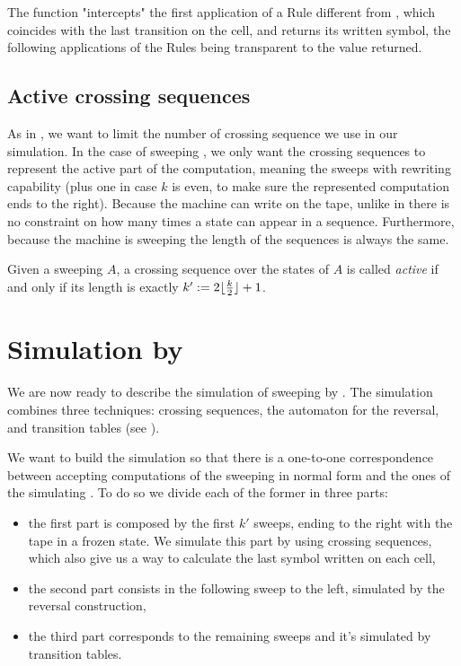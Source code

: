 The function "intercepts" the first application of a Rule different from , which coincides with the last transition on the cell, and returns its written symbol, the following applications of the Rules being transparent to the value returned.


\subsection{Active crossing sequences}
As in \TDFAs, we want to limit the number of crossing sequence we use in our simulation.
In the case of sweeping \kDLAs, we only want the crossing sequences to represent the active part of the computation, meaning the sweeps with rewriting capability (plus one in case $k$ is even, to make sure the represented computation ends to the right).
Because the machine can write on the tape, unlike in \TDFAs there is no constraint on how many times a state can appear in a sequence. Furthermore, because the machine is sweeping the length of the sequences is always the same.
\begin{defn}
	Given a sweeping \kLA $A$, a crossing sequence over the states of $A$ is called \emph{active} if and only if its length is exactly $k':=2\lfloor \frac{k}{2} \rfloor+1$.
\end{defn}



\section{Simulation by \NFA}\label{sec:swkdla-to-NFA}
We are now ready to describe the simulation of sweeping \kDLAs by \ONFAs.
The simulation combines three techniques: crossing sequences, the automaton for the reversal, and transition tables (see ).

We want to build the simulation so that there is a one-to-one correspondence between accepting computations of the sweeping \kDLA in normal form and the ones of the simulating \NFA.
To do so we divide each of the former in three parts:
\begin{itemize}
	\item the first part is composed by the first $k'$ sweeps, ending to the right with the tape in a frozen state. We simulate this part by using crossing sequences, which also give us a way to calculate the last symbol written on each cell,
	\item the second part consists in the following sweep to the left, simulated by the reversal construction,
	\item the third part corresponds to the remaining sweeps and it's simulated by transition tables.
\end{itemize}

